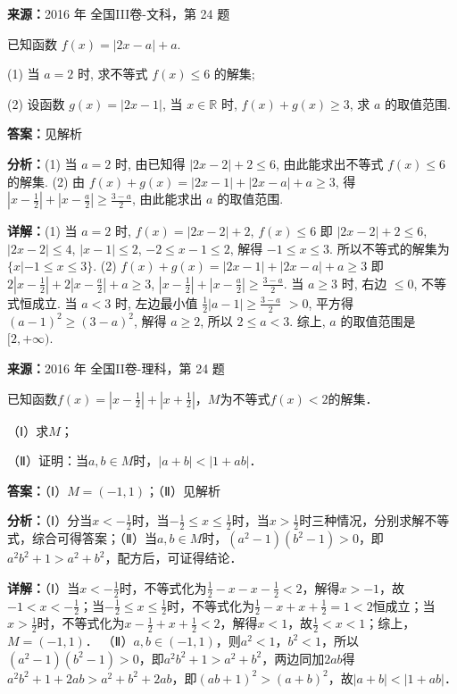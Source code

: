 \begin{question}[points=10]
\textbf{来源：}2016 年 全国III卷-文科，第 24 题\par
已知函数 $f(x)=|2x-a|+a$.

(1) 当 $a=2$ 时, 求不等式 $f(x)\le 6$ 的解集;

(2) 设函数 $g(x)=|2x-1|$, 当 $x\in\mathbb{R}$ 时, $f(x)+g(x)\ge 3$, 求 $a$ 的取值范围.
\begin{solution}
\textbf{答案：}见解析

\textbf{分析：}(1) 当 $a=2$ 时, 由已知得 $|2x-2|+2\le 6$, 由此能求出不等式 $f(x)\le 6$ 的解集.
(2) 由 $f(x)+g(x)=|2x-1|+|2x-a|+a\ge 3$, 得 $|x-\frac{1}{2}|+|x-\frac{a}{2}|\ge \frac{3-a}{2}$, 由此能求出 $a$ 的取值范围.

\textbf{详解：}(1) 当 $a=2$ 时, $f(x)=|2x-2|+2$, $f(x)\le 6$ 即 $|2x-2|+2\le 6$, $|2x-2|\le 4$, $|x-1|\le 2$, $-2\le x-1\le 2$, 解得 $-1\le x\le 3$. 所以不等式的解集为 $\{x|-1\le x\le 3\}$.
(2) $f(x)+g(x)=|2x-1|+|2x-a|+a\ge 3$ 即 $2|x-\frac{1}{2}|+2|x-\frac{a}{2}|+a\ge 3$, $|x-\frac{1}{2}|+|x-\frac{a}{2}|\ge \frac{3-a}{2}$. 当 $a\ge 3$ 时, 右边 $\le 0$, 不等式恒成立. 当 $a<3$ 时, 左边最小值 $\frac{1}{2}|a-1|\ge \frac{3-a}{2}$ $>0$, 平方得 $(a-1)^2\ge (3-a)^2$, 解得 $a\ge 2$, 所以 $2\le a<3$. 综上, $a$ 的取值范围是 $[2,+\infty)$.
\end{solution}
\end{question}

\begin{question}[points=10]
\textbf{来源：}2016 年 全国II卷-理科，第 24 题\par
已知函数$f(x)=|x-\frac12|+|x+\frac12|$，$M$为不等式$f(x)<2$的解集．

（Ⅰ）求$M$；

（Ⅱ）证明：当$a,b\in M$时，$|a+b|<|1+ab|$．
\begin{solution}
\textbf{答案：}（Ⅰ）$M=(-1,1)$；（Ⅱ）见解析

\textbf{分析：}（Ⅰ）分当$x<-\frac12$时，当$-\frac12\le x\le \frac12$时，当$x>\frac12$时三种情况，分别求解不等式，综合可得答案；（Ⅱ）当$a,b\in M$时，$(a^2-1)(b^2-1)>0$，即$a^2b^2+1>a^2+b^2$，配方后，可证得结论．

\textbf{详解：}（Ⅰ）当$x<-\frac12$时，不等式化为$\frac12-x-x-\frac12<2$，解得$x>-1$，故$-1<x<-\frac12$；当$-\frac12\le x\le \frac12$时，不等式化为$\frac12-x+x+\frac12=1<2$恒成立；当$x>\frac12$时，不等式化为$x-\frac12+x+\frac12<2$，解得$x<1$，故$\frac12<x<1$；综上，$M=(-1,1)$．
（Ⅱ）$a,b\in(-1,1)$，则$a^2<1$，$b^2<1$，所以$(a^2-1)(b^2-1)>0$，即$a^2b^2+1>a^2+b^2$，两边同加$2ab$得$a^2b^2+1+2ab>a^2+b^2+2ab$，即$(ab+1)^2>(a+b)^2$，故$|a+b|<|1+ab|$．
\end{solution}
\end{question}

